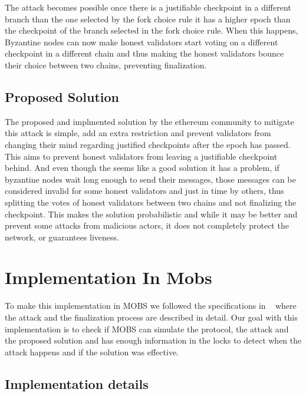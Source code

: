 The attack becomes possible once there is a justifiable checkpoint in a different branch than the one selected by the fork choice rule it has a
higher epoch than the checkpoint of the branch selected in the fork choice rule. When this happens, Byzantine nodes can now
make honest validators start voting on a different checkpoint in a different chain and thus making the honest validators
bounce their choice between two chains, preventing finalization.


\subsection{Proposed Solution}\label{sub:proposed_patch}

The proposed and implmented solution by the ethereum community to mitigate this attack is simple, add an extra restriction
and prevent validators from changing their mind regarding justified checkpoints after the epoch has passed. This aims to prevent
honest validators from leaving a justifiable checkpoint behind. And even though the seems like a good solution it has a problem,
if byzantine nodes wait long enough to send their messages, those messages can be considered invalid for some honest validators and
just in time by others, thus splitting the votes of honest validators between two chains and not finalizing the checkpoint. This
makes the solution probabilistic and while it may be better and prevent some attacks from malicious actors, it does not completely
protect the network, or guarantees liveness.


\section{Implementation In Mobs}\label{sub:implementation_in_mobs}

To make this implementation in MOBS we followed the specifications in ~\cite{ethereum_analysis} where the attack and 
the finalization process are described in detail. Our goal with this implementation is to check if MOBS can simulate
the protocol, the attack and the proposed solution and has enough information in the locks to detect when the attack happens and
if the solution was effective.

\subsection{Implementation details}\label{sub:implementation_details}

